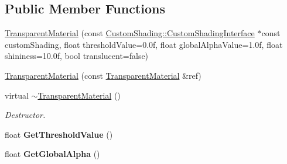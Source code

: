 \subsection*{Public Member Functions}
\begin{DoxyCompactItemize}
\item 
\mbox{\hyperlink{class_geometry_engine_1_1_geometry_material_1_1_transparent_material_abbc191aa9453c1279319e53766fd5dc4}{Transparent\+Material}} (const \mbox{\hyperlink{class_geometry_engine_1_1_custom_shading_1_1_custom_shading_interface}{Custom\+Shading\+::\+Custom\+Shading\+Interface}} $\ast$const custom\+Shading, float threshold\+Value=0.\+0f, float global\+Alpha\+Value=1.\+0f, float shininess=10.\+0f, bool translucent=false)
\item 
\mbox{\hyperlink{class_geometry_engine_1_1_geometry_material_1_1_transparent_material_a1687629a2e24bc6b2ef6971723111eee}{Transparent\+Material}} (const \mbox{\hyperlink{class_geometry_engine_1_1_geometry_material_1_1_transparent_material}{Transparent\+Material}} \&ref)
\item 
\mbox{\label{class_geometry_engine_1_1_geometry_material_1_1_transparent_material_a7a71619c3cb1214c1b3e31fd752341e2}} 
virtual \mbox{\hyperlink{class_geometry_engine_1_1_geometry_material_1_1_transparent_material_a7a71619c3cb1214c1b3e31fd752341e2}{$\sim$\+Transparent\+Material}} ()
\begin{DoxyCompactList}\small\item\em Destructor. \end{DoxyCompactList}\item 
\mbox{\label{class_geometry_engine_1_1_geometry_material_1_1_transparent_material_a54f17a71f747afdc27c3712a591cf4ab}} 
float {\bfseries Get\+Threshold\+Value} ()
\item 
\mbox{\label{class_geometry_engine_1_1_geometry_material_1_1_transparent_material_acbf5bf9a51d111ad8d020755716d13d1}} 
float {\bfseries Get\+Global\+Alpha} ()
\item 
\mbox{\label{class_geometry_engine_1_1_geometry_material_1_1_transparent_material_afc7175239967f643813558883b80a732}} 

\end{DoxyCompactItemize}
